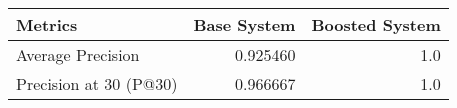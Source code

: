 \begin{tabular}{lrr}
\toprule
               Metrics &  Base System &  Boosted System \\
\midrule
     Average Precision &     0.925460 &             1.0 \\
Precision at 30 (P@30) &     0.966667 &             1.0 \\
\bottomrule
\end{tabular}
